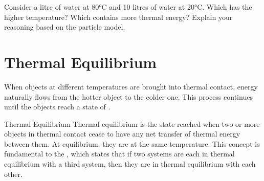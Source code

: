 \begin{stopandthink}
Consider a litre of water at 80°C and 10 litres of water at 20°C. Which has the higher temperature? Which contains more thermal energy? Explain your reasoning based on the particle model.
\end{stopandthink}


\FloatBarrier

\section{Thermal Equilibrium}
\label{sec:thermal_equilibrium}
\FloatBarrier

When objects at different temperatures are brought into thermal contact, energy naturally flows from the hotter object to the colder one. This process continues until the objects reach a state of .

\begin{keyconcept}{Thermal Equilibrium}
Thermal equilibrium is the state reached when two or more objects in thermal contact cease to have any net transfer of thermal energy between them. At equilibrium, they are at the same temperature. This concept is fundamental to the , which states that if two systems are each in thermal equilibrium with a third system, then they are in thermal equilibrium with each other.
\end{keyconcept}


